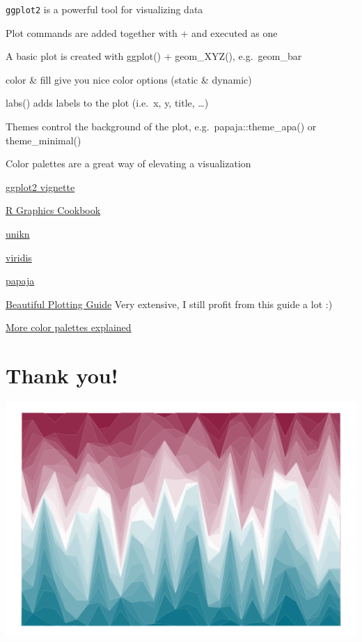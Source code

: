 \documentclass[
]{book}
\begin{document}
\texttt{ggplot2} is a powerful tool for visualizing data

Plot commands are added together with + and executed as one

A basic plot is created with ggplot() + geom\_XYZ(), e.g.~geom\_bar

color \& fill give you nice color options (static \& dynamic)

labs() adds labels to the plot (i.e.~x, y, title, \ldots)

Themes control the background of the plot, e.g.~papaja::theme\_apa() or theme\_minimal()

Color palettes are a great way of elevating a visualization

\href{https://ggplot2.tidyverse.org/articles/ggplot2.html}{ggplot2 vignette}

\href{https://r-graphics.org/}{R Graphics Cookbook}

\href{https://hneth.github.io/unikn/index.html}{unikn}

\href{https://sjmgarnier.github.io/viridisLite/reference/viridis.html}{viridis}

\href{https://www.rdocumentation.org/packages/papaja/versions/0.1.2}{papaja}

\href{https://www.cedricscherer.com/2019/08/05/a-ggplot2-tutorial-for-beautiful-plotting-in-r/}{Beautiful Plotting Guide} Very extensive, I still profit from this guide a lot :)

\href{http://www.sthda.com/english/wiki/ggplot2-colors-how-to-change-colors-automatically-and-manually}{More color palettes explained}

\section{Thank you!}\label{thank-you}

\includegraphics{_main_files/figure-latex/unikn-plot-1.pdf}
\end{document}
